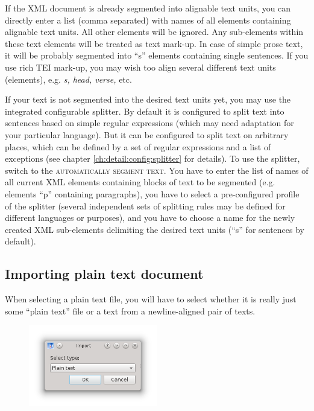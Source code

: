 \documentclass[a4paper,10pt,oneside]{book}
\newcommand{\menu}[1]{\textsc{#1}}
\begin{document}
If the XML document is already segmented into alignable text units, you can directly enter a list (comma separated) with names of all elements containing alignable text units. All other elements will be ignored. Any sub-elements within these text elements will be treated as text mark-up. In case of simple prose text, it will be probably segmented into ``s'' elements containing single sentences. If you use rich TEI mark-up, you may wish too align several different text units (elements), e.g. \emph{s, head, verse,} etc.

If your text is not segmented into the desired text units yet, you may use the integrated configurable splitter. By default it is configured to split text into sentences based on simple regular expressions (which may need adaptation for your particular language). But it can be configured to split text on arbitrary places, which can be defined by a set of regular expressions and a list of exceptions (see chapter \ref{ch:detail:config:splitter} for details). To use the splitter, switch to the \menu{automatically segment text}. You have to enter the list of names of all current XML elements containing blocks of text to be segmented (e.g. elements ``p'' containing paragraphs), you have to select a pre-configured profile of the splitter (several independent sets of splitting rules may be defined for different languages or purposes), and you have to choose a name for the newly created XML sub-elements delimiting the desired text units (``s'' for sentences by default).

\subsection{Importing plain text document}\label{ch:detail:managing_local:new:txt}

When selecting a plain text file, you will have to select whether it is really just some ``plain text'' file or a text from a newline-aligned pair of texts.

\begin{figure}[htb]
 \includegraphics[width=0.5\textwidth]{screenshots/text_import_type.png}
\end{figure}
\end{document}
